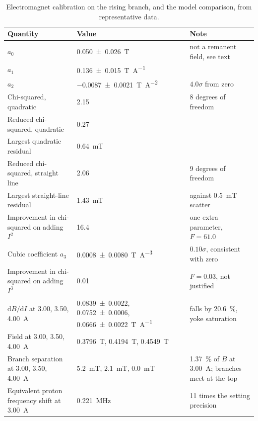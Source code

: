 \documentclass[11pt,a4paper]{article}
\begin{document}
\begin{table}[htbp]
\centering
\caption{Electromagnet calibration on the rising branch, and the model comparison, from
representative data.}
\label{tab:mag}
\footnotesize
\begin{tabular}{@{}L{4.8cm}L{7.0cm}L{3.9cm}@{}}
\toprule
Quantity & Value & Note \\
\midrule
$a_0$ & \SI{0.050 \pm 0.026}{\tesla} & not a remanent field, see text \\
$a_1$ & \SI{0.136 \pm 0.015}{\tesla\per\ampere} & \\
$a_2$ & \SI{-0.0087 \pm 0.0021}{\tesla\per\ampere\squared} & $4.0\sigma$ from zero \\
Chi-squared, quadratic & 2.15 & 8 degrees of freedom \\
Reduced chi-squared, quadratic & 0.27 & \\
Largest quadratic residual & \SI{0.64}{\milli\tesla} & \\
Reduced chi-squared, straight line & 2.06 & 9 degrees of freedom \\
Largest straight-line residual & \SI{1.43}{\milli\tesla} & against \SI{0.5}{\milli\tesla} scatter \\
Improvement in chi-squared on adding $I^{2}$ & 16.4 & one extra parameter, $F = 61.0$ \\
Cubic coefficient $a_3$ & \SI{0.0008 \pm 0.0080}{\tesla\per\ampere\cubed} & $0.10\sigma$, consistent with zero \\
Improvement in chi-squared on adding $I^{3}$ & 0.01 & $F = 0.03$, not justified \\
\midrule
$\mathrm{d}B/\mathrm{d}I$ at 3.00, 3.50, \SI{4.00}{\ampere} & \SI{0.0839 \pm 0.0022}{}, \SI{0.0752 \pm 0.0006}{}, \SI{0.0666 \pm 0.0022}{\tesla\per\ampere} & falls by \SI{20.6}{\percent}, yoke saturation \\
Field at 3.00, 3.50, \SI{4.00}{\ampere} & \SI{0.3796}{\tesla}, \SI{0.4194}{\tesla}, \SI{0.4549}{\tesla} & \\
\midrule
Branch separation at 3.00, 3.50, \SI{4.00}{\ampere} & \SI{5.2}{\milli\tesla}, \SI{2.1}{\milli\tesla}, \SI{0.0}{\milli\tesla} & \SI{1.37}{\percent} of $B$ at \SI{3.00}{\ampere}; branches meet at the top \\
Equivalent proton frequency shift at \SI{3.00}{\ampere} & \SI{0.221}{\mega\hertz} & 11 times the setting precision \\
\bottomrule
\end{tabular}
\end{table}
\end{document}

